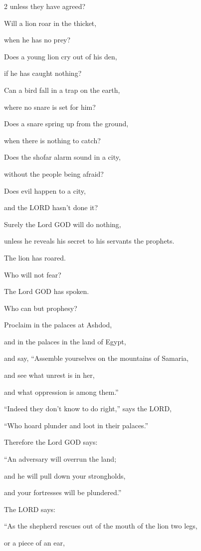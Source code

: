 \begin{multicols}{2}
	unless they have agreed?
	
	\myverse{}Will a lion roar in the thicket,
	
	when he has no prey?
	
	Does a young lion cry out of his den,
	
	if he has caught nothing?
	
	\myverse{}Can a bird fall in a trap on the earth,
	
	where no snare is set for him?
	
	Does a snare spring up from the ground,
	
	when there is nothing to catch?
	
	\myverse{}Does the shofar alarm sound in a city,
	
	without the people being afraid?
	
	Does evil happen to a city,
	
	and the LORD hasn’t done it?
	
	\myverse{}Surely the Lord GOD will do nothing,
	
	unless he reveals his secret to his servants the prophets.
	
	\myverse{}The lion has roared.
	
	Who will not fear?
	
	The Lord GOD has spoken.
	
	Who can but prophesy?
	
	\myverse{}Proclaim in the palaces at Ashdod,
	
	and in the palaces in the land of Egypt,
	
	and say, “Assemble yourselves on the mountains of Samaria,
	
	and see what unrest is in her,
	
	and what oppression is among them.”
	
	\myverse{}“Indeed they don’t know to do right,” says the LORD,
	
	“Who hoard plunder and loot in their palaces.”
	
	\myverse{}Therefore the Lord GOD says:
	
	“An adversary will overrun the land;
	
	and he will pull down your strongholds,
	
	and your fortresses will be plundered.”
	
	\myverse{}The LORD says:
	
	“As the shepherd rescues out of the mouth of the lion two legs,
	
	or a piece of an ear,
	

\end{multicols}
